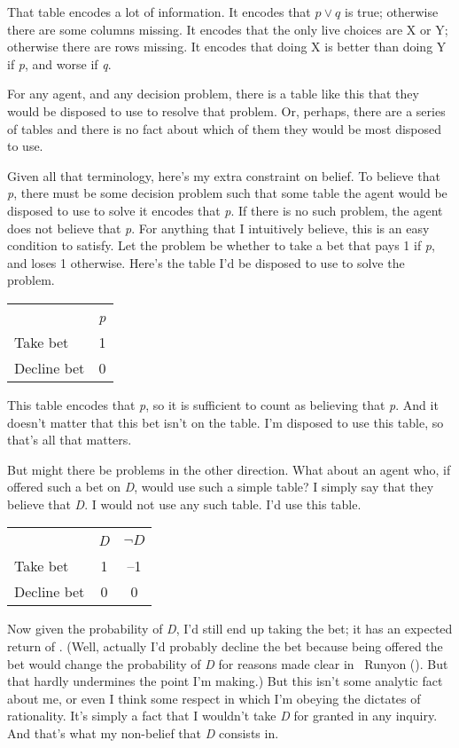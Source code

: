 \documentclass[
  10pt,
  letterpaper,
  DIV=11,
  numbers=noendperiod,
  twoside]{scrartcl}
\begin{document}
That table encodes a lot of information. It encodes that \(p \vee q\) is
true; otherwise there are some columns missing. It encodes that the only
live choices are X or Y; otherwise there are rows missing. It encodes
that doing X is better than doing Y if \emph{p}, and worse if \emph{q}.

For any agent, and any decision problem, there is a table like this that
they would be disposed to use to resolve that problem. Or, perhaps,
there are a series of tables and there is no fact about which of them
they would be most disposed to use.

Given all that terminology, here's my extra constraint on belief. To
believe that \emph{p}, there must be some decision problem such that
some table the agent would be disposed to use to solve it encodes that
\emph{p}. If there is no such problem, the agent does not believe that
\emph{p}. For anything that I intuitively believe, this is an easy
condition to satisfy. Let the problem be whether to take a bet that pays
1 if \emph{p}, and loses 1 otherwise. Here's the table I'd be disposed
to use to solve the problem.

\begin{longtable}[]{@{}lc@{}}
\toprule\noalign{}
\endhead
\bottomrule\noalign{}
\endlastfoot
& \emph{p} \\
Take bet & 1 \\
Decline bet & 0 \\
\end{longtable}

This table encodes that \emph{p}, so it is sufficient to count as
believing that \emph{p}. And it doesn't matter that this bet isn't on
the table. I'm disposed to use this table, so that's all that matters.

But might there be problems in the other direction. What about an agent
who, if offered such a bet on \emph{D}, would use such a simple table? I
simply say that they believe that \emph{D}. I would not use any such
table. I'd use this table.

\begin{longtable}[]{@{}lcc@{}}
\toprule\noalign{}
\endhead
\bottomrule\noalign{}
\endlastfoot
& \emph{D} & \(\neg D\) \\
Take bet & 1 & --1 \\
Decline bet & 0 & 0 \\
\end{longtable}

Now given the probability of \emph{D}, I'd still end up taking the bet;
it has an expected return of . (Well, actually I'd probably decline the
bet because being offered the bet would change the probability of
\emph{D} for reasons made clear in ~Runyon
(). But that hardly
undermines the point I'm making.) But this isn't some analytic fact
about me, or even I think some respect in which I'm obeying the dictates
of rationality. It's simply a fact that I wouldn't take \emph{D} for
granted in any inquiry. And that's what my non-belief that \emph{D}
consists in.
\end{document}
